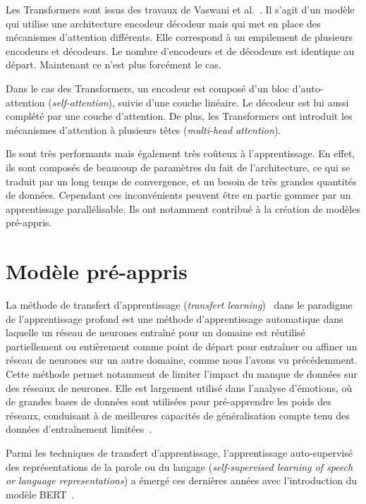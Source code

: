 Les Transformers sont issus des travaux de Vaswani et al.~\cite{Vaswani2017}. Il s’agit d’un modèle qui utilise une architecture encodeur décodeur mais qui met en place des mécanismes d’attention différents. Elle correspond à un empilement de plusieurs encodeurs et décodeurs. Le nombre d’encodeurs et de décodeurs est identique au départ. Maintenant ce n'est plus forcément le cas.

Dans le cas des Transformers, un encodeur est composé d’un bloc d’auto-attention (\textit{self-attention}), suivie d’une couche linéaire. Le décodeur est lui aussi complété par une couche d’attention. De plus, les Transformers ont introduit les mécanismes d’attention à plusieurs têtes (\textit{multi-head attention}).

Ils sont très performants mais également très coûteux à l'apprentissage. En effet, ils sont composés de beaucoup de paramètres du fait de l'architecture, ce qui se traduit par un long temps de convergence, et un besoin de très grandes quantités de données. Cependant ces inconvénients peuvent être en partie gommer par un apprentissage parallélisable. Ils ont notamment contribué à la création de modèles pré-appris.


\section{Modèle pré-appris}

La méthode de transfert d'apprentissage (\textit{transfert learning})~\cite{Goodfellow2016} dans le paradigme de l'apprentissage profond est une méthode d'apprentissage automatique dans laquelle un réseau de neurones entraîné pour un domaine est réutilisé partiellement ou entièrement comme point de départ pour entraîner ou affiner un réseau de neurones sur un autre domaine, comme nous l'avons vu précédemment. Cette méthode permet notamment de limiter l'impact du manque de données sur des réseaux de neurones.
Elle est largement utilisé dans l'analyse d'émotions, où de grandes bases de données sont utilisées pour pré-apprendre les poids des réseaux, conduisant à de meilleures capacités de généralisation compte tenu des données d’entraînement limitées~\cite{Dong2018}.

Parmi les techniques de transfert d'apprentissage, l'apprentissage auto-supervisé des représentations de la parole ou du langage (\textit{self-supervised learning of speech or language representations}) a émergé ces dernières années avec l'introduction du modèle BERT~\cite{Devlin2019}.

